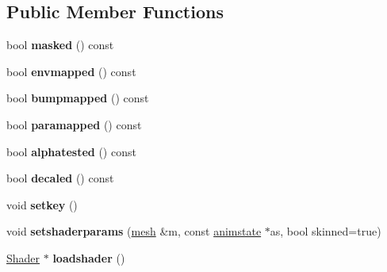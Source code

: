 \subsection*{Public Member Functions}
\begin{DoxyCompactItemize}
\item 
\mbox{\label{structanimmodel_1_1skin_a585e71532d10fb9a6be80df26f6e892a}} 
bool {\bfseries masked} () const
\item 
\mbox{\label{structanimmodel_1_1skin_ace7eabdb2e6b308b99fb0be59ec80576}} 
bool {\bfseries envmapped} () const
\item 
\mbox{\label{structanimmodel_1_1skin_a47bf8677db4dcfb7fed8fafc8ac14806}} 
bool {\bfseries bumpmapped} () const
\item 
\mbox{\label{structanimmodel_1_1skin_a34cdc72328ae63c92f006f4cbc719c4e}} 
bool {\bfseries paramapped} () const
\item 
\mbox{\label{structanimmodel_1_1skin_a6175124ab4208bd7e2ddadf075b4215c}} 
bool {\bfseries alphatested} () const
\item 
\mbox{\label{structanimmodel_1_1skin_af80ed75cb584cdf13eee6614ec07c0a4}} 
bool {\bfseries decaled} () const
\item 
\mbox{\label{structanimmodel_1_1skin_a110a03e60c91ab85010784bd324cb9ef}} 
void {\bfseries setkey} ()
\item 
\mbox{\label{structanimmodel_1_1skin_a6f74d641645137d39e423eb2deaf877c}} 
void {\bfseries setshaderparams} (\hyperlink{structanimmodel_1_1mesh}{mesh} \&m, const \hyperlink{structanimmodel_1_1animstate}{animstate} $\ast$as, bool skinned=true)
\item 
\mbox{\label{structanimmodel_1_1skin_aa5aed969e62e6e4d3bda0f822bcfc8a8}} 
\hyperlink{struct_shader}{Shader} $\ast$ {\bfseries loadshader} ()
\item 
\mbox{\label{structanimmodel_1_1skin_a47591021c6e0475127bce4e97a52ce30}} 

\end{DoxyCompactItemize}
